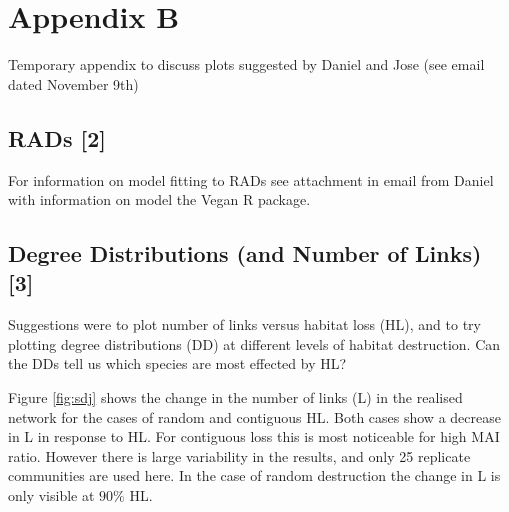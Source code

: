 
\chapter{Appendix B}
\label{app:app0b}

Temporary appendix to discuss plots suggested by Daniel and Jose (see email dated November 9th)



\section{RADs [2]}
\label{sec:rads}

For information on model fitting to RADs see attachment in email from Daniel with information on model the Vegan R package.

\section{Degree Distributions (and Number of Links) [3]}
\label{sec:dd}

Suggestions were to plot number of links versus habitat loss (HL), and to try plotting degree distributions (DD) at different levels of habitat destruction. Can the DDs tell us which species are most effected by HL?

Figure \ref{fig:sdj} shows the change in the number of links (L) in the realised network for the cases of random and contiguous HL. Both cases show a decrease in L in response to HL. For contiguous loss this is most noticeable for high MAI ratio. However there is large variability in the results, and only 25 replicate communities are used here. In the case of random destruction the change in L is only visible at $90\%$ HL.  

